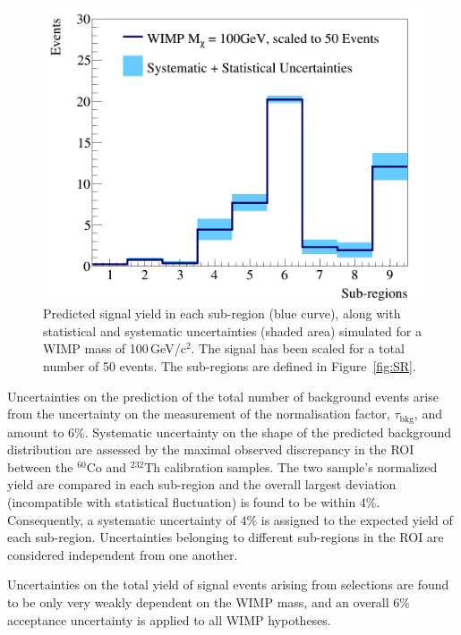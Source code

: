 \begin{figure}[t!]
  \includegraphics[width=\linewidth]{wimp_sys_unc.png}
  \caption{Predicted signal yield in each sub-region (blue curve), along with statistical and systematic uncertainties (shaded area) simulated for a WIMP mass of 100\,GeV/c$^2$.  The signal has been scaled for a total number of 50 events. The sub-regions are defined in Figure~\ref{fig:SR}.}
  \label{fig:unc}
\end{figure}


Uncertainties on the  prediction of the total number of background events arise from the uncertainty on the measurement of the normalisation 
factor, $\tau_{\text{bkg}}$, and amount to 6\%. %
Systematic uncertainty on the shape of the predicted background distribution are assessed by the maximal observed discrepancy in the ROI between
the $^{60}$Co and $^{232}$Th calibration samples. The two sample's normalized yield are compared in each sub-region and the overall largest deviation (incompatible
with statistical fluctuation) is found to be within 4\%.  Consequently, a systematic uncertainty of 4\% is assigned  to the expected yield of each sub-region.
Uncertainties belonging to different sub-regions in the ROI are considered independent from one another.

Uncertainties on the total yield of signal events arising from selections are found to be only very weakly dependent on 
the WIMP mass, and an overall 6\% acceptance uncertainty is applied to all WIMP hypotheses. 

